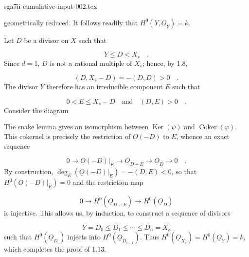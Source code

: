 \begin{filecontents*}{sga7ii-cumulative-input-002.tex}

geometrically reduced.  It follows readily that
$H^0(Y,\underline{O}_Y)=k$.

Let $D$ be a divisor on $X$ such that

\begin{equation*}
Y\leq D<X_s \quad .
\end{equation*}
Since $d=1$, $D$ is not a rational multiple of $X_s$; hence, by 1.8,

\begin{equation*}
(D,X_s-D)=-(D,D)>0 \quad .
\end{equation*}
The divisor $Y$ therefore has an irreducible component $E$ such that

\begin{equation*}
0<E\leq X_s-D \quad\text{and}\quad (D,E)>0 \quad .
\end{equation*}
Consider the diagram

\begin{center}
\end{center}
The snake lemma gives an isomorphism between $\operatorname{Ker}(\psi)$ and
$\operatorname{Coker}(\varphi)$.  This cokernel is precisely the restriction of
$\underline{O}(-D)$ to $E$, whence an exact sequence

\begin{equation*}
0\longrightarrow\underline{O}(-D)|_E
\longrightarrow\underline{O}_{D+E}
\longrightarrow\underline{O}_D\longrightarrow0 \quad .
\end{equation*}
By construction,
$\deg_E(\underline{O}(-D)|_E)=-(D,E)<0$, so that
$H^0(\underline{O}(-D)|_E)=0$ and the restriction map

\begin{equation*}
0\longrightarrow H^0(\underline{O}_{D+E})
\longrightarrow H^0(\underline{O}_D)
\end{equation*}
is injective.  This allows us, by induction, to construct a sequence of divisors

\begin{equation*}
Y=D_0\leq D_1\leq\cdots\leq D_n=X_s
\end{equation*}
such that $H^0(\underline{O}_{D_i})$ injects into
$H^0(\underline{O}_{D_{i-1}})$.  Thus
$H^0(\underline{O}_{X_s})=H^0(\underline{O}_Y)=k$, which completes the proof of
1.13.


\end{filecontents*}
